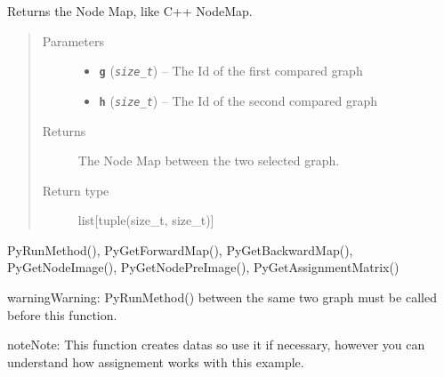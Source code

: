\documentclass[letterpaper,10pt,english]{sphinxmanual}
\begin{document}
\begin{fulllineitems}
\label{doc:PythonGedLib.PyGetNodeMap}
Returns the Node Map, like C++ NodeMap.
\begin{quote}\begin{description}
\item[{Parameters}] \leavevmode\begin{itemize}
\item {} 
\textbf{\texttt{g}} (\emph{\texttt{size\_t}}) -- The Id of the first compared graph

\item {} 
\textbf{\texttt{h}} (\emph{\texttt{size\_t}}) -- The Id of the second compared graph

\end{itemize}

\item[{Returns}] \leavevmode
The Node Map between the two selected graph.

\item[{Return type}] \leavevmode
list{[}tuple(size\_t, size\_t){]}

\end{description}\end{quote}




PyRunMethod(), PyGetForwardMap(), PyGetBackwardMap(), PyGetNodeImage(), PyGetNodePreImage(), PyGetAssignmentMatrix()



\begin{notice}{warning}{Warning:}
PyRunMethod() between the same two graph must be called before this function.
\end{notice}

\begin{notice}{note}{Note:}
This function creates datas so use it if necessary, however you can understand how assignement works with this example.
\end{notice}

\end{fulllineitems}

\end{document}
